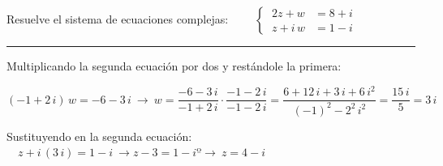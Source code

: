 \begin{miejercicio}

Resuelve el sistema de ecuaciones complejas: $\qquad \begin{cases} \ 2z+w&=8+i\\ \ z+i\, w&=1-i \end{cases}$

\vspace{2mm}

\rule{250pt}{0.5pt}

\vspace{2mm} Multiplicando la segunda ecuación por dos y restándole la primera:

\vspace{2mm} $(-1+2\, i)\, w =-6-3\, i \ \to \ w=\dfrac{-6-3\, i}{-1+2\, i} \cdot \dfrac{-1-2\, i}{-1-2\, i}=\dfrac{6+12\, i+3\, i+6\, i^2}{(-1)^2-2^2\, i^2}=\dfrac{15\, i}{5}=3\, i$

\vspace{2mm} Sustituyendo en la segunda ecuación:
$\quad z+i\, (3\, i)=1-i \ \to z-3=1-i º \to \ z=4-i$
\end{miejercicio}


